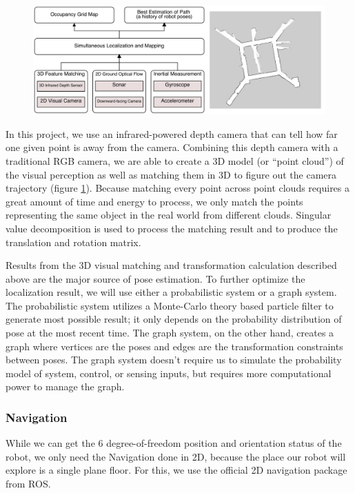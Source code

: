 \documentclass[12pt, letterpaper]{article}
\begin{document}
\begin{figure}[h]
\centering
\includegraphics[width=16cm]{images/SLAM.pdf}
\label{fig:slam}
\end{figure}

In this project, we use an infrared-powered depth camera that can tell how far one given point is away from the camera. Combining this depth camera with a traditional RGB camera, we are able to create a 3D model (or ``point cloud'') of the visual perception as well as matching them in 3D to figure out the camera trajectory (figure \ref{fig:slam}). Because matching every point across point clouds requires a great amount of time and energy to process, we only match the points representing the same object in the real world from different clouds. Singular value decomposition is used to process the matching result and to produce the translation and rotation matrix.

Results from the 3D visual matching and transformation calculation described above are the major source of pose estimation. To further optimize the localization result, we will use either a probabilistic system or a graph system. The probabilistic system utilizes a Monte-Carlo theory based particle filter to generate most possible result; it only depends on the probability distribution of pose at the most recent time. The graph system, on the other hand, creates a graph where vertices are the poses and edges are the transformation constraints between poses. The graph system doesn't require us to simulate the probability model of system, control, or sensing inputs, but requires more computational power to manage the graph.

\subsubsection{Navigation}

While we can get the 6 degree-of-freedom position and orientation status of the robot, we only need the Navigation done in 2D, because the place our robot will explore is a single plane floor. For this, we use the official 2D navigation package from ROS.
\end{document}
